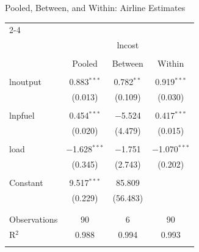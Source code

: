 \documentclass[aspectratio=169, handout]{beamer}
\numberwithin{equation}{section}
\begin{document}
\begin{frame}{Pooled, Between, and Within: Airline Estimates}
\scriptsize{
\begin{table}[!htbp] \centering
\begin{tabular}{@{\extracolsep{5pt}}lccc} 
\\[-1.8ex]\hline 
\hline \\[-1.8ex] 
\cline{2-4} 
\\[-1.8ex] & \multicolumn{3}{c}{lncost} \\ 
\\[-1.8ex] & Pooled & Between & Within\\ 
\hline \\[-1.8ex] 
 lnoutput & 0.883$^{***}$ & 0.782$^{**}$ & 0.919$^{***}$ \\ 
  & (0.013) & (0.109) & (0.030) \\ 
  & & & \\ 
 lnpfuel & 0.454$^{***}$ & $-$5.524 & 0.417$^{***}$ \\ 
  & (0.020) & (4.479) & (0.015) \\ 
  & & & \\ 
 load & $-$1.628$^{***}$ & $-$1.751 & $-$1.070$^{***}$ \\ 
  & (0.345) & (2.743) & (0.202) \\ 
  & & & \\ 
 Constant & 9.517$^{***}$ & 85.809 &  \\ 
  & (0.229) & (56.483) &  \\ 
  & & & \\ 
\hline \\[-1.8ex] 
Observations & 90 & 6 & 90 \\ 
R$^{2}$ & 0.988 & 0.994 & 0.993 \\ 
\hline 
\hline \\[-1.8ex] 
\end{tabular} 
\end{table} }
\end{frame}
\end{document}
